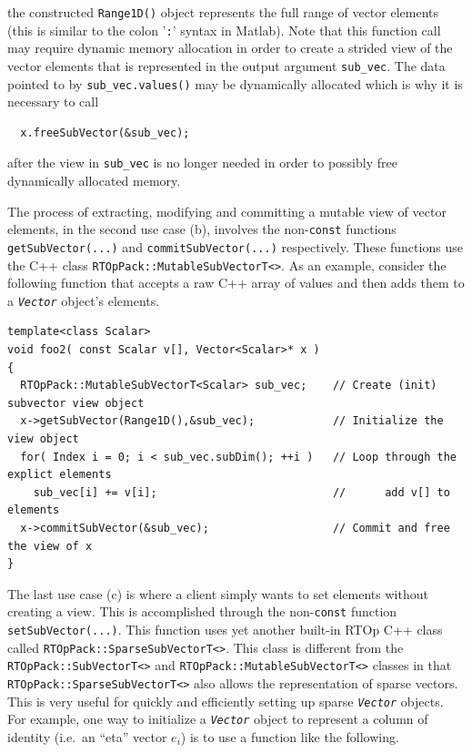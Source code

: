 {}\noindent{}the constructed {}\texttt{Range1D()} object represents
the full range of vector elements (this is similar to the colon
'\texttt{:}' syntax in Matlab).  Note that this function call may
require dynamic memory allocation in order to create a strided view of
the vector elements that is represented in the output argument
{}\texttt{sub\_vec}.  The data pointed to by
{}\texttt{sub\_vec.values()} may be dynamically allocated which is why
it is necessary to call

{\scriptsize\begin{verbatim}
  x.freeSubVector(&sub_vec);
\end{verbatim}}

{}\noindent{}after the view in {}\texttt{sub\_vec} is no longer needed
in order to possibly free dynamically allocated memory.

The process of extracting, modifying and committing a mutable view of
vector elements, in the second use case (b), involves the
non-\texttt{const} functions {}\texttt{getSubVector(...)} and
{}\texttt{commit\-Sub\-Vector(...)} respectively.  These functions use
the C++ class {}\texttt{RTOpPack::\-Mutable\-Sub\-VectorT<>}.  As an
example, consider the following function that accepts a raw C++ array
of values and then adds them to a {}\texttt{\textit{Vector}} object's
elements.

{\scriptsize\begin{verbatim}
template<class Scalar>
void foo2( const Scalar v[], Vector<Scalar>* x )
{
  RTOpPack::MutableSubVectorT<Scalar> sub_vec;    // Create (init) subvector view object
  x->getSubVector(Range1D(),&sub_vec);            // Initialize the view object
  for( Index i = 0; i < sub_vec.subDim(); ++i )   // Loop through the explict elements
    sub_vec[i] += v[i];                           //      add v[] to elements
  x->commitSubVector(&sub_vec);                   // Commit and free the view of x
}
\end{verbatim}}

The last use case (c) is where a client simply wants to set elements
without creating a view.  This is accomplished through the
non-\texttt{const} function {}\texttt{set\-Sub\-Vector(...)}.  This
function uses yet another built-in RTOp C++ class called
{}\texttt{RTOpPack::\-Sparse\-Sub\-VectorT<>}.  This class is
different from the {}\texttt{RTOpPack::\-SubVectorT<>} and
{}\texttt{RTOpPack::\-Mutable\-Sub\-VectorT<>} classes in that
{}\texttt{RTOpPack::\-Sparse\-Sub\-VectorT<>} also allows the
representation of sparse vectors.  This is very useful for quickly and
efficiently setting up sparse {}\texttt{\textit{Vector}} objects.  For
example, one way to initialize a {}\texttt{\textit{Vector}} object to
represent a column of identity (i.e.~an ``eta'' vector $e_i$) is to
use a function like the following.

